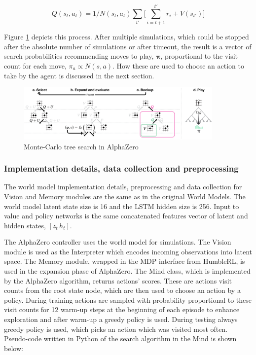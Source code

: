 $$Q(s_t, a_t) = 1/N(s_t, a_t) \sum_{t'}\Big[ \sum^{t'}_{i = t + 1}r_i + V(s_{t'}) \Big]$$

Figure \ref{Fig.MCTSinAlphaZero} depicts this process. After multiple simulations, which could be stopped after the absolute number of simulations or after timeout, the result is a vector of search probabilities recommending moves to play, $\boldsymbol\pi$, proportional to the visit count for each move, $\pi_a \propto N(s, a)$. How these are used to choose an action to take by the agent is discussed in the next section.

\begin{figure}[H]
\includegraphics[width=0.9\textwidth,keepaspectratio]{figures/AlphaZero/MCTS.png}
\caption{Monte-Carlo tree search in AlphaZero \cite{Algo.AlphaGoZero}}
\label{Fig.MCTSinAlphaZero}
\end{figure}

\subsubsection{Implementation details, data collection and preprocessing}

The world model implementation details, preprocessing and data collection for Vision and Memory modules are the same as in the original World Models. The world model latent state size is 16 and the LSTM hidden size is 256. Input to value and policy networks is the same concatenated features vector of latent and hidden states, $[z_t\,h_t]$.

The AlphaZero controller uses the world model for simulations. The Vision module is used as the Interpreter which encodes incoming observations into latent space. The Memory module, wrapped in the MDP interface from HumbleRL, is used in the expansion phase of AlphaZero. The Mind class, which is implemented by the AlphaZero algorithm, returns actions' scores. These are actions visit counts from the root state node, which are then used to choose an action by a policy. During training actions are sampled with probability proportional to these visit counts for 12 warm-up steps at the beginning of each episode to enhance exploration and after warm-up a greedy policy is used. During testing always greedy policy is used, which picks an action which was visited most often.
Pseudo-code written in Python of the search algorithm in the Mind is shown below:

